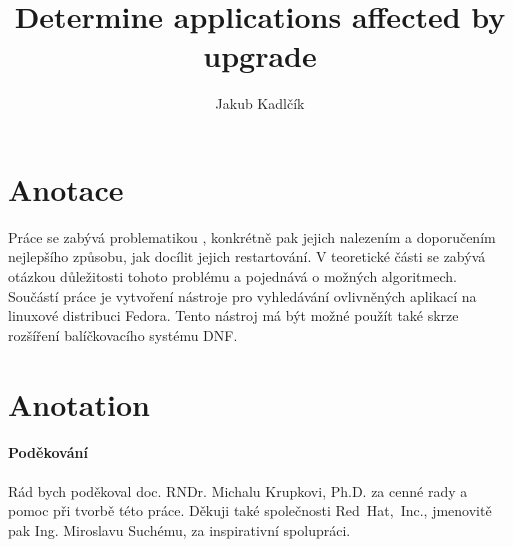 \documentclass[10pt,a4paper]{article}
\title{Determine applications affected by upgrade}
\author{Jakub Kadlčík}
\begin{document}
	\maketitle
	\newpage

	\section{Anotace} %
	Práce se zabývá problematikou , konkrétně pak jejich nalezením a doporučením nejlepšího způsobu, jak docílit jejich restartování. V teoretické části se zabývá otázkou důležitosti tohoto problému a pojednává o možných algoritmech. Součástí práce je vytvoření nástroje pro vyhledávání ovlivněných aplikací na linuxové distribuci Fedora. Tento nástroj má být možné použít také skrze rozšíření balíčkovacího systému DNF.

	\section{Anotation}

	\paragraph{Poděkování} Rád bych poděkoval doc. RNDr. Michalu Krupkovi, Ph.D. za cenné rady a pomoc při tvorbě této práce. Děkuji také společnosti Red~Hat,~Inc., jmenovitě pak Ing. Miroslavu Suchému, za inspirativní spolupráci.

	\newpage
	\tableofcontents
	\newpage
\end{document}
